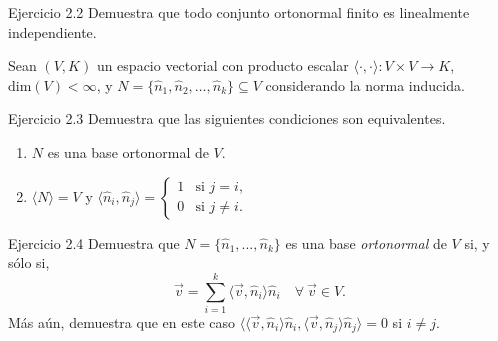 \documentclass[12pt,dvipsnames]{article}
\numberwithin{equation}{section}
\begin{document}
%
%
%

Ejercicio 2.2 Demuestra que todo conjunto ortonormal finito es linealmente independiente. \\

\begin{center}
    Sean $(V,K)$ un espacio vectorial con producto escalar $\langle \cdot , \cdot \rangle:V\times V\to K$, $\text{dim}(V)<\infty$, y $N=\{\hat{n}_1, \hat{n}_2, \dots, \hat{n}_k\}\subseteq V$ considerando la norma inducida.
\end{center}

Ejercicio 2.3 Demuestra que las siguientes condiciones son equivalentes.
\begin{enumerate}[label=(\alph*)]

    \item $N$ es una base ortonormal de $V$.

    \item $\langle N \rangle = V$ y $ \langle \hat{n}_i , \hat{n}_j \rangle = \begin{cases} 1 &\text{si } j=i, \\ 0 &\text{si } j\neq i. \end{cases}$
\end{enumerate}

Ejercicio 2.4 Demuestra que $N=\{\hat{n}_1,...,\hat{n}_k\}$ es una base \emph{ortonormal} de $V$ si, y sólo si,
\[
    \vec{v} = \sum_{i=1}^k \langle \vec{v} , \hat{n}_i \rangle \hat{n}_i \quad \forall \ \vec{v}\in V.
\]
Más aún, demuestra que en este caso $\big \langle \langle \vec{v} , \hat{n}_i \rangle \hat{n}_i, \langle \vec{v} , \hat{n}_j \rangle \hat{n}_j \big \rangle = 0$ si $i\neq j$. 
\end{document}
